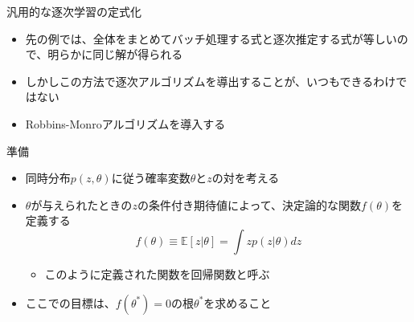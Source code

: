 \begin{frame}{汎用的な逐次学習の定式化}
 \begin{itemize}
  \item 先の例では、全体をまとめてバッチ処理する式と逐次推定する式が等しいので、明らかに同じ解が得られる
  \item しかしこの方法で逐次アルゴリズムを導出することが、いつもできるわけではない
  \item \alert{Robbins-Monroアルゴリズム}を導入する
 \end{itemize}
\end{frame}


\begin{frame}{準備}
 \begin{itemize}
  \item 同時分布$p(z,\theta)$に従う確率変数$\theta$と$z$の対を考える
  \item $\theta$が与えられたときの$z$の条件付き期待値によって、決定論的な関数$f(\theta)$を定義する
        \begin{equation}
         f(\theta) \equiv \mathbb{E}[z|\theta] = \int zp(z|\theta)dz
        \end{equation}
        \begin{itemize}
         \item このように定義された関数を回帰関数と呼ぶ
        \end{itemize}
  \item ここでの目標は、$f(\theta^\ast)=0$の根$\theta^\ast$を求めること
 \end{itemize}
\end{frame}

